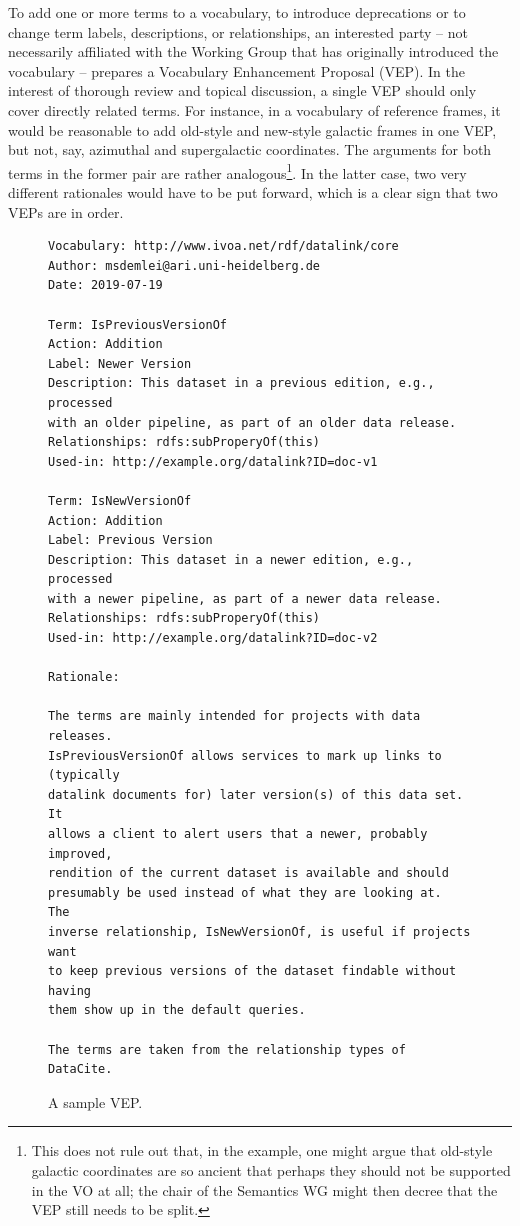 \documentclass[11pt,a4paper]{ivoa}
\begin{document}
To add one or more terms to a vocabulary, to introduce deprecations or
to change term labels, descriptions, or relationships,
an interested party -- not necessarily affiliated with the Working Group
that has originally introduced the vocabulary -- prepares a Vocabulary
Enhancement Proposal (VEP).  In the interest of thorough review and
topical discussion, a single VEP should only cover directly related
terms.  For instance, in a vocabulary of reference frames, it would be
reasonable to add old-style and new-style galactic frames in one
VEP, but not, say, azimuthal and supergalactic coordinates.  The
arguments for both terms in the former pair are rather
analogous\footnote{This does not rule out that, in the example, one
might argue that old-style galactic coordinates are so ancient that
perhaps they should not be supported in the VO at all; the chair of the
Semantics WG might then decree that the VEP still needs to be split.}.
In the latter case, two very different rationales would have
to be put forward, which is a clear sign that two VEPs are in order.

\begin{figure}
\begin{verbatim}
Vocabulary: http://www.ivoa.net/rdf/datalink/core
Author: msdemlei@ari.uni-heidelberg.de
Date: 2019-07-19

Term: IsPreviousVersionOf
Action: Addition
Label: Newer Version
Description: This dataset in a previous edition, e.g., processed 
with an older pipeline, as part of an older data release.
Relationships: rdfs:subProperyOf(this)
Used-in: http://example.org/datalink?ID=doc-v1

Term: IsNewVersionOf
Action: Addition
Label: Previous Version
Description: This dataset in a newer edition, e.g., processed
with a newer pipeline, as part of a newer data release.
Relationships: rdfs:subProperyOf(this)
Used-in: http://example.org/datalink?ID=doc-v2

Rationale: 

The terms are mainly intended for projects with data releases.
IsPreviousVersionOf allows services to mark up links to (typically
datalink documents for) later version(s) of this data set.  It
allows a client to alert users that a newer, probably improved,
rendition of the current dataset is available and should
presumably be used instead of what they are looking at.  The
inverse relationship, IsNewVersionOf, is useful if projects want
to keep previous versions of the dataset findable without having
them show up in the default queries. 

The terms are taken from the relationship types of DataCite.
\end{verbatim}

\caption{A sample VEP.}
\label{fig:vepsample}
\end{figure}
\end{document}
